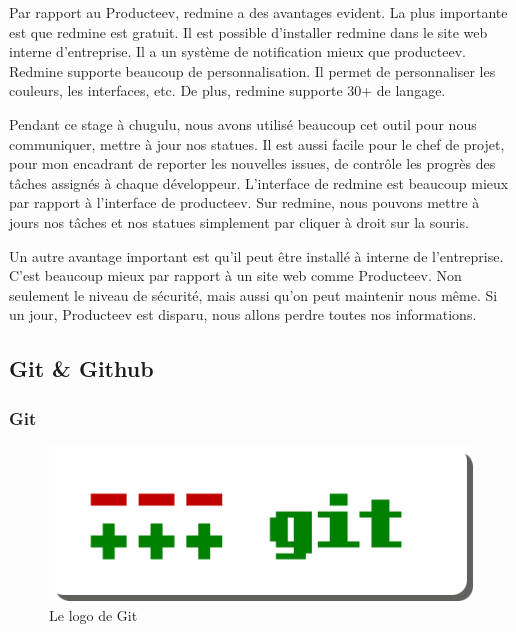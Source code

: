 Par rapport au Producteev, redmine a des avantages evident. La plus importante est que redmine est gratuit. Il est possible d'installer redmine dans le site web interne d'entreprise. Il a un système de notification mieux que producteev. Redmine supporte beaucoup de personnalisation. Il permet de personnaliser les couleurs, les interfaces, etc. De plus, redmine supporte 30+ de langage. 

Pendant ce stage à chugulu, nous avons utilisé beaucoup cet outil pour nous communiquer, mettre à jour nos statues. Il est aussi facile pour le chef de projet, pour mon encadrant de reporter les nouvelles issues, de contrôle les progrès des tâches assignés à chaque développeur. L'interface de redmine est beaucoup mieux par rapport à l'interface de producteev. Sur redmine, nous pouvons mettre à jours nos tâches et nos statues simplement par cliquer à droit sur la souris. 

Un autre avantage important est qu'il peut être installé à interne de l'entreprise. C'est beaucoup mieux par rapport à un site web comme Producteev. Non seulement le niveau de sécurité, mais aussi qu’on peut maintenir nous même. Si un jour, Producteev est disparu, nous allons perdre toutes nos informations.



\subsection{Git \& Github} %

\subsubsection{Git} %


\begin{figure}[htbp]
	\centering
		\includegraphics[width=6in]{Image/GitLogo.png}
	\caption{Le logo de Git}
	\label{fig:Image_GitLogo}
\end{figure}

